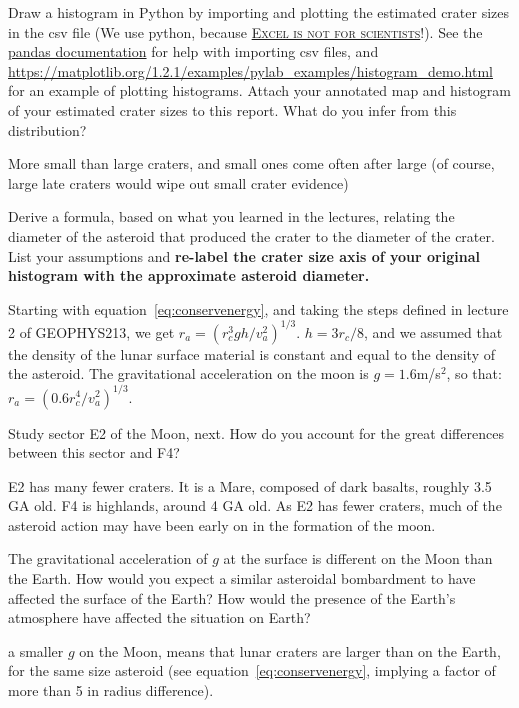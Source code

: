 \documentclass[addpoints]{exam}
\begin{document}
\begin{questions}
  \question[10] Draw a histogram in Python by importing and plotting
  the estimated crater sizes in the csv file (We use python, because
  {\color{blue} \href{http://www.sciencemag.org/news/2016/08/one-five-genetics-papers-contains-errors-thanks-microsoft-excel}{\textsc{Excel
      is not for scientists}}}!). See the {\color{blue} \href{https://pandas.pydata.org/docs/reference/api/pandas.read_csv.html}{pandas documentation}} for help with importing csv files, and
  {\color{blue} \url{https://matplotlib.org/1.2.1/examples/pylab_examples/histogram_demo.html}} for an example of plotting histograms. Attach your annotated map and
  histogram of your estimated crater sizes to this report.
\pagebreak
  \question[10] What do you infer from this distribution?
  \begin{solutionorlines}[2in]
    More small than large craters, and small ones come often after large
    (of course, large late craters would wipe out small crater evidence)
  \end{solutionorlines}
  \question[10] Derive a formula, based on what you learned in the
  lectures, relating the diameter of the asteroid that produced the
  crater to the diameter of the crater. List your assumptions and
  {\bf re-label the crater size axis of your original histogram with the
  approximate asteroid diameter.}
  \begin{solutionorlines}[6in]
    Starting with equation~\ref{eq:conservenergy}, and taking the steps
    defined in lecture 2 of GEOPHYS213, we get
    $r_a = \left(r_c^3 g h /v_a^2\right)^{1/3}$. $h=3r_c/8$, and we
    assumed that the density of the lunar surface material is constant
    and equal to the density of the asteroid. The gravitational
    acceleration on the moon is $g=1.6$m/s$^2$, so that:
    $r_a = \left(0.6r_c^4/v_a^2\right)^{1/3}$.
  \end{solutionorlines}
  
  \question[10] Study sector E2 of the Moon, next. How do you account
  for the great differences between this sector and F4? 
  \begin{solutionorlines}[2in]
    E2 has many fewer craters. It is a Mare, composed of dark basalts,
    roughly 3.5 GA old. F4 is highlands, around 4 GA old. As E2 has
    fewer craters, much of the asteroid action may have been early on in the
    formation of the moon.
  \end{solutionorlines}
  The gravitational acceleration of $g$ at the surface is different on
  the Moon than the Earth. \question[10] How would you expect a similar
  asteroidal bombardment to have affected the surface of the Earth?  How
  would the presence of the Earth's atmosphere have affected the
  situation on Earth?
  \begin{solutionorlines}[2in]
    a smaller $g$ on the Moon, means that lunar craters are larger than
    on the Earth, for the same size asteroid (see
    equation~\ref{eq:conservenergy}, implying a factor of more than 5 in
    radius difference).
  \end{solutionorlines}
\end{questions}
\end{document}

